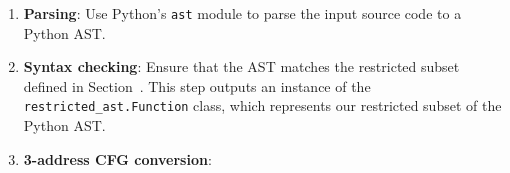 \documentclass[sigconf, screen, natbib=false, dvipsnames, table]{acmart}
\theoremstyle{definition}
\begin{document}
\begin{enumerate}
  \item
        \textbf{Parsing}:
        Use Python's \texttt{ast} module to parse the input source code to a Python AST.
  \item
        \textbf{Syntax checking}:
        Ensure that the AST matches the restricted subset defined in Section~.
        This step outputs an instance of the \texttt{restricted\_ast.Function} class, which represents our restricted subset of the Python AST.
  \item
        \textbf{3-address CFG conversion}:


\end{enumerate}
\end{document}
